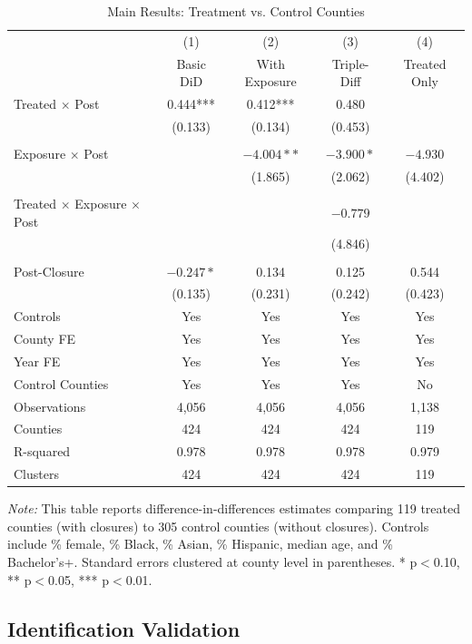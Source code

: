 \documentclass[12pt]{article}
\begin{document}
\begin{table}[H]
\centering
\caption{Main Results: Treatment vs. Control Counties}
\label{tab:main_controls}
\small
\begin{tabular}{lcccc}
\toprule
 & (1) & (2) & (3) & (4) \\
 & Basic DiD & With Exposure & Triple-Diff & Treated Only \\
\midrule
Treated $\times$ Post & 0.444*** & 0.412*** & 0.480 & \\
 & (0.133) & (0.134) & (0.453) & \\
 & & & & \\
Exposure $\times$ Post & & $-4.004**$ & $-3.900*$ & $-4.930$ \\
 & & (1.865) & (2.062) & (4.402) \\
 & & & & \\
Treated $\times$ Exposure $\times$ Post & & & $-0.779$ & \\
 & & & (4.846) & \\
 & & & & \\
Post-Closure & $-0.247*$ & 0.134 & 0.125 & 0.544 \\
 & (0.135) & (0.231) & (0.242) & (0.423) \\
\midrule
Controls & Yes & Yes & Yes & Yes \\
County FE & Yes & Yes & Yes & Yes \\
Year FE & Yes & Yes & Yes & Yes \\
Control Counties & Yes & Yes & Yes & No \\
Observations & 4,056 & 4,056 & 4,056 & 1,138 \\
Counties & 424 & 424 & 424 & 119 \\
R-squared & 0.978 & 0.978 & 0.978 & 0.979 \\
Clusters & 424 & 424 & 424 & 119 \\
\bottomrule
\end{tabular}
\captionsetup{justification=raggedright,singlelinecheck=false}
\vspace{0.2cm}
\textit{Note:} This table reports difference-in-differences estimates comparing 119 treated counties (with closures) to 305 control counties (without closures). Controls include \% female, \% Black, \% Asian, \% Hispanic, median age, and \% Bachelor's+. Standard errors clustered at county level in parentheses. * p$<$0.10, ** p$<$0.05, *** p$<$0.01.
\end{table}

\clearpage

\subsection{Identification Validation}
\end{document}
